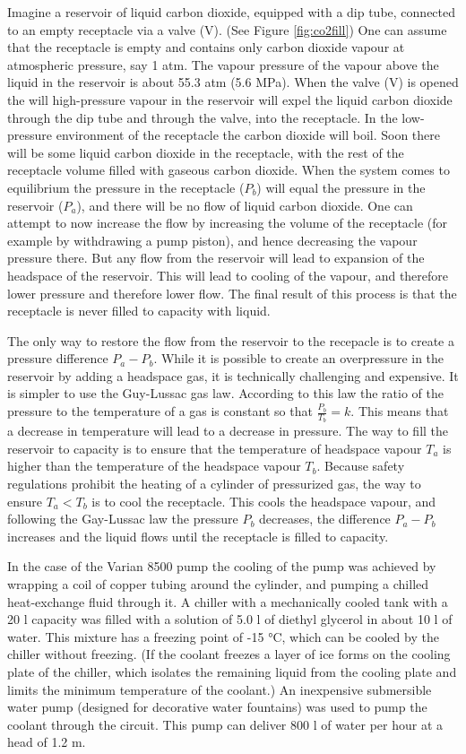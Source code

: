 Imagine a reservoir of liquid carbon dioxide, equipped with a dip tube,
connected to an empty receptacle via a valve (V). (See Figure \ref{fig:co2fill})
One can assume that the receptacle is empty and contains only carbon dioxide
vapour at atmospheric pressure, say 1 atm. The vapour pressure of the vapour
above the liquid in the reservoir is about 55.3 atm (5.6 MPa).
When the valve (V) is opened the will high-pressure vapour in the reservoir will
expel the liquid carbon dioxide through the dip tube and through the valve, into
the receptacle. In the low-pressure environment of the receptacle the carbon
dioxide will boil. Soon there will be some liquid carbon dioxide in the
receptacle, with the rest of the receptacle volume filled with gaseous carbon
dioxide. When the system comes to equilibrium the pressure in the receptacle
($P_b$) will equal the pressure in the reservoir ($P_a$), and there will be no
flow of liquid carbon dioxide. One can attempt to now increase the flow by
increasing the volume of the receptacle (for example by withdrawing a pump
piston), and hence decreasing the vapour pressure there.
But any flow from the reservoir will lead to expansion of the headspace of the
reservoir. This will lead to cooling of the vapour, and therefore lower pressure
and therefore lower flow. The final result of this process is that the
receptacle is never filled to capacity with liquid.

The only way to restore the flow from the reservoir to the recepacle is to
create a pressure difference $P_a - P_b$. While it is possible to create an
overpressure in the reservoir by adding a headspace gas, it is technically
challenging and expensive. It is simpler to use the Guy-Lussac gas law.
According to this law the ratio of the pressure to the temperature of a gas is
constant so that $\frac{P_b}{T_b} = k$. This means that a decrease in
temperature will lead to a decrease in pressure. The way to fill the reservoir
to capacity is to ensure that the temperature of headspace vapour $T_a$ is higher
than the temperature of the headspace vapour $T_b$. Because safety regulations
prohibit the heating of a cylinder of pressurized gas, the way to ensure $T_a <
T_b$ is to cool the receptacle. This cools the headspace vapour, and following
the Gay-Lussac law the pressure $P_b$ decreases, the difference $P_a - P_b$
increases and the liquid flows until the receptacle is filled to capacity.
 
In the case of the Varian 8500 pump the cooling of the pump was achieved by
wrapping a coil of copper tubing around the cylinder, and pumping a chilled
heat-exchange fluid through it. A chiller with a mechanically cooled tank with a
20 l capacity was filled with a solution of 5.0 l of diethyl glycerol in about
10 l of water. This mixture has a freezing point of -15 \si{\degreeCelsius},
which can be cooled by the chiller without freezing. (If the coolant freezes a
layer of ice forms on the cooling plate of the chiller, which isolates the
remaining liquid from the cooling plate and limits the minimum temperature of
the coolant.) An inexpensive submersible water pump (designed for decorative
water fountains) was used to pump the coolant through the circuit.
This pump can deliver 800 l of water per hour at a head of 1.2 \si{\metre}.

